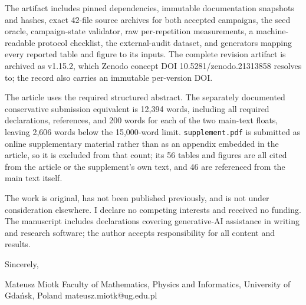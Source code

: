 \documentclass[11pt,a4paper]{article}
\begin{document}
The artifact includes pinned dependencies, immutable documentation snapshots and hashes, exact 42-file source archives for both accepted campaigns, the seed oracle, campaign-state validator, raw per-repetition measurements, a machine-readable protocol checklist, the external-audit dataset, and generators mapping every reported table and figure to its inputs. The complete revision artifact is archived as v1.15.2, which Zenodo concept DOI 10.5281/zenodo.21313858 resolves to; the record also carries an immutable per-version DOI.

The article uses the required structured abstract. The separately documented conservative submission equivalent is 12,394 words, including all required declarations, references, and 200 words for each of the two main-text floats, leaving 2,606 words below the 15,000-word limit. \texttt{supplement.pdf} is submitted as online supplementary material rather than as an appendix embedded in the article, so it is excluded from that count; its 56 tables and figures are all cited from the article or the supplement's own text, and 46 are referenced from the main text itself.

The work is original, has not been published previously, and is not under consideration elsewhere. I declare no competing interests and received no funding. The manuscript includes declarations covering generative-AI assistance in writing and research software; the author accepts responsibility for all content and results.

Sincerely,

Mateusz Miotk Faculty of Mathematics, Physics and Informatics, University of Gdańsk, Poland mateusz.miotk@ug.edu.pl
\end{document}
